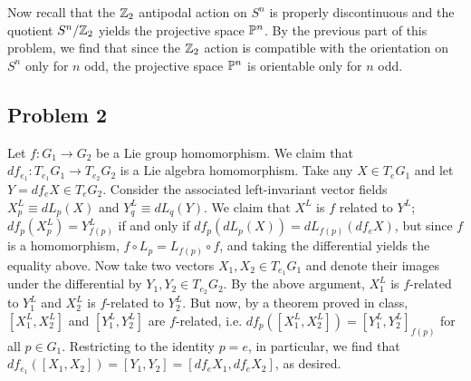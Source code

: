\documentclass{../mathnotes}
\begin{document}
\begin{enumerate}[(a)]
        Now recall that the $\mathbb{Z}_2$ antipodal action on $S^n$ is properly discontinuous and the quotient
        $S^n/\mathbb{Z}_2$ yields the projective space $\mathbb{P}^n$. By the previous part of this problem, we find that
        since the $\mathbb{Z}_2$ action is compatible with the orientation on $S^n$ only for $n$ odd,
        the projective space $\mathbb{P}^n$ is orientable only for $n$ odd.
\end{enumerate}

\subsection*{Problem 2}
Let $f:G_1\to G_2$ be a Lie group homomorphism. We claim that $df_{e_1}:T_{e_1}G_1\to T_{e_2}G_2$
is a Lie algebra homomorphism. Take any $X\in T_eG_1$ and let $Y=df_eX\in T_eG_2$. Consider the
associated left-invariant vector fields $X^L_p\equiv dL_p(X)$ and $Y^L_q\equiv dL_q(Y)$. We claim
that $X^L$ is $f$ related to $Y^L$; $df_p(X^L_p)=Y^L_{f(p)}$ if and only if $df_p(dL_p(X))=dL_{f(p)}(df_eX)$,
but since $f$ is a homomorphism, $f\circ L_p=L_{f(p)}\circ f$, and taking the differential yields
the equality above. Now take two vectors $X_1,X_2\in T_{e_1}G_1$ and denote their images under the differential
by $Y_1,Y_2\in T_{e_2}G_2$. By the above argument, $X_1^L$ is $f$-related to $Y_1^L$ and $X_2^L$
is $f$-related to $Y_2^L$. But now, by a theorem proved in class, $[X_1^L,X_2^L]$ and $[Y_1^L,Y_2^L]$ are
$f$-related, i.e. $df_p([X_1^L,X_2^L])=[Y_1^L,Y_2^L]_{f(p)}$ for all $p\in G_1$. Restricting to the identity $p=e$,
in particular, we find that $df_{e_1}([X_1,X_2])=[Y_1,Y_2]=[df_eX_1,df_eX_2]$, as desired.
\end{document}
